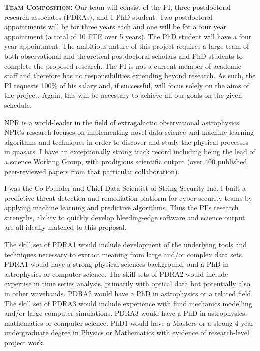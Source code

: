 \smallskip
\smallskip
\noindent
\textbf{\textsc{Team Composition:}}
Our team will consist of the PI, three postdoctoral research
associates (PDRAs), and 1 PhD student.  Two postdoctoral appointments
will be for three years each and one will be for a four year
appointment (a total of 10 FTE over 5 years).  The PhD student
will have a four year appointment.  The ambitious nature of this
project requires a large team of both observational and theoretical
postdoctoral scholars and PhD students to complete the proposed
research.  The PI is not a current member of academic staff and
therefore has no responsibilities extending beyond research.  As such,
the PI requests 100\% of his salary and, if successful, will focus solely on
the aims of the project.  Again, this will be necessary to achieve all
our goals on the given schedule.

\smallskip
\smallskip
\noindent
NPR is a world-leader in the field of extragalactic observational
astrophysics. NPR's research focuses on implementing novel data
science and machine learning algorithms and techniques in order to
discover and study the physical processes in quasars. I have an
exceptionally strong track record including being the lead of a
science Working Group, with prodigious scientific output
(\href{https://tinyurl.com/ycxd8lb6}{over 400 published, peer-reviewed
papers} from that particular collaboration).

\smallskip
\smallskip
\noindent
I was the Co-Founder and Chief Data Scientist of String Security
Inc. I built a predictive threat detection and remediation
platform for cyber security teams by applying machine learning and
predictive algorithms.  Thus the PI's research strengths, ability to
quickly develop bleeding-edge software and science output are all
ideally matched to this proposal.

\smallskip
\smallskip
\noindent
The skill set of PDRA1 would include development of the underlying
tools and techniques necessary to extract meaning from large and/or
complex data sets.  PDRA1 would have a strong physical sciences
background, and a PhD in astrophysics or computer science.  The skill
sets of PDRA2 would include expertise in time series analysis,
primarily with optical data but potentially also in other wavebands.
PDRA2 would have a PhD in astrophysics or a related field.  The skill
set of PDRA3 would include experience with fluid mechanics modelling
and/or large computer simulations.  PDRA3 would have a PhD in
astrophysics, mathematics or computer science.  PhD1 would have a
Masters or a strong 4-year undergraduate degree in Physics or
Mathematics with evidence of research-level project work.

